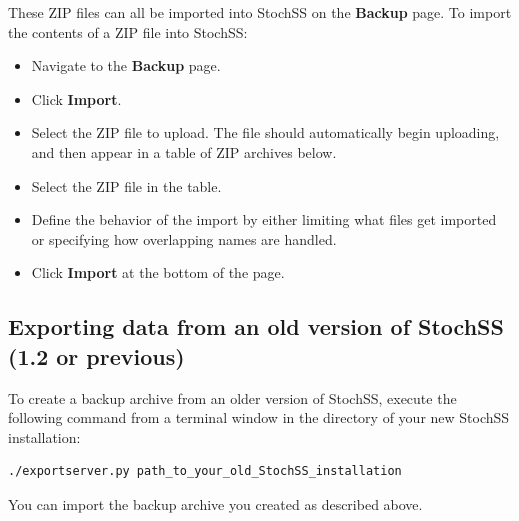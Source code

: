 These ZIP files can all be imported into StochSS on the \textbf{Backup} page. To import the contents of a ZIP file into StochSS:

\begin{itemize}
\item Navigate to the \textbf{Backup} page.
\item Click \textbf{Import}.
\item Select the ZIP file to upload. The file should automatically begin uploading, and then appear in a table of ZIP archives below.
\item Select the ZIP file in the table.
\item Define the behavior of the import by either limiting what files get imported or specifying how overlapping names are handled.
\item Click \textbf{Import} at the bottom of the page.
\end{itemize}

\subsection{Exporting data from an old version of StochSS (1.2 or previous)}
To create a backup archive from an older version of StochSS, execute the following command from a terminal window in the directory of your new StochSS installation:
\begin{verbatim}
./exportserver.py path_to_your_old_StochSS_installation
\end{verbatim}
You can import the backup archive you created as described above.

